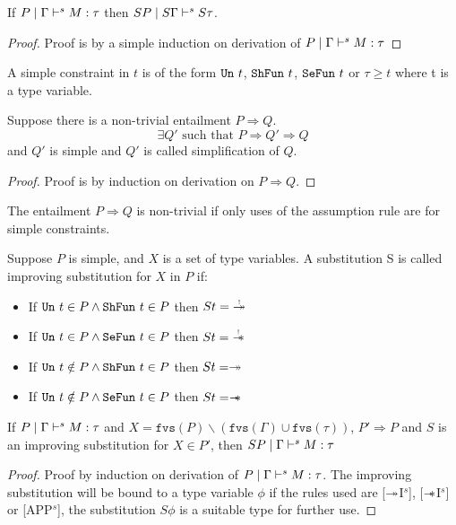 \begin{lemma}\label{lemma:syntax-closed-under-sub}
  If $P \mid \Gamma \vdash^s M:\tau$ then $S P \mid S \Gamma \vdash^s S \tau$.
\end{lemma}
\begin{proof}
  Proof is by a simple induction on derivation of $P \mid \Gamma \vdash^s M:\tau$
\end{proof}

\begin{defn}
  A simple constraint in $t$ is of the form $\texttt{Un}\ t$, $\texttt{ShFun}\ t$, $\texttt{SeFun}\ t$ or $\tau \geq t$ where t is a type variable.
\end{defn}

\begin{lemma}
  Suppose there is a non-trivial entailment $P \Rightarrow Q$.  $$\exists Q' \text{\ such that\ } P \Rightarrow Q' \Rightarrow Q$$ and $Q'$ is simple and
  $Q'$ is called simplification of $Q$.
\end{lemma}
\begin{proof}
  Proof is by induction on derivation on $P \Rightarrow Q$.
\end{proof}

\begin{defn}
  The entailment $P \Rightarrow Q$ is non-trivial if only uses of the assumption rule are for simple constraints.
\end{defn}

\begin{defn}
  Suppose $P$ is simple, and $X$ is a set of type variables.
  A substitution S is called improving substitution for $X$ in $P$ if:
  \begin{itemize}
  \item If $\texttt{Un}\ t \in P \wedge \texttt{ShFun}\ t \in P$ then $S t = \tightoverset{\scalebox{0.5}{!}}{\shimp}$
  \item If $\texttt{Un}\ t \in P \wedge \texttt{SeFun}\ t \in P$ then $S t = \tightoverset{\scalebox{0.5}{!}}{\sepimp}$
  \item If $\texttt{Un}\ t \notin P \wedge \texttt{ShFun}\ t \in P$ then $S t = \twoheadrightarrow$
  \item If $\texttt{Un}\ t \notin P \wedge \texttt{SeFun}\ t \in P$ then $S t = \mathrel{-\mkern-6mu*}$
  \end{itemize}
\end{defn}

\begin{lemma}\label{lemma:improving-sub}
  If $P \mid \Gamma \vdash^s M:\tau$ and $X = \texttt{fvs}(P) \backslash (\texttt{fvs}(\Gamma) \cup \texttt{fvs}(\tau))$,
  $P' \Rightarrow P$ and $S$ is an improving substitution for $X \in P'$, then $S P \mid \Gamma \vdash^s M :\tau$
\end{lemma}
\begin{proof}
  Proof by induction on derivation of $P \mid \Gamma \vdash^s M:\tau$.
  The improving substitution will be bound to a type variable $\phi$ if the rules used are [$\twoheadrightarrow$I$^s$], [$\mathrel{-\mkern-6mu*}$I$^s$] or [APP$^s$], the
  substitution $S \phi$ is a suitable type for further use.
\end{proof}

